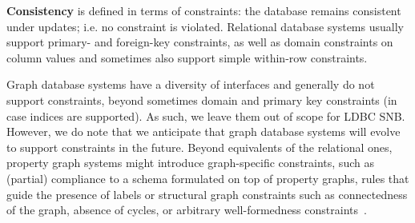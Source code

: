 {\bf Consistency} is defined in terms of constraints: the database remains 
consistent under updates; i.e. no constraint is violated.
Relational database systems usually support primary- and foreign-key 
constraints, as well as domain constraints on column values and 
sometimes also support simple within-row constraints.

Graph database systems have a diversity of interfaces and generally do not
support constraints, beyond sometimes domain and primary key constraints 
(in case indices are supported).
As such, we leave them out of scope for LDBC SNB. 
However, we do note that we anticipate that graph database 
systems will evolve to support constraints in the future. 
Beyond equivalents of the relational ones, property graph systems 
might introduce graph-specific constraints, such as (partial) compliance to
a schema formulated on top of property graphs, rules that guide the 
presence of labels or structural graph constraints such as
connectedness of the graph, absence of cycles, %
or arbitrary well-formedness constraints~\cite{DBLP:journals/sosym/SemerathBHSV17}.
